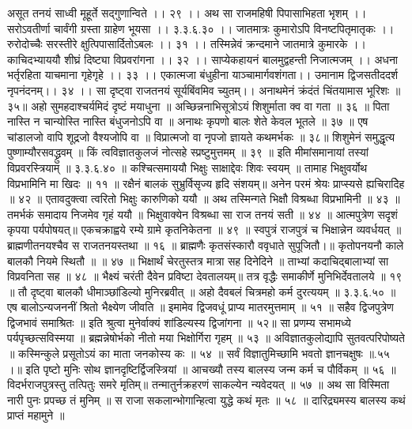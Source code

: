 असूत तनयं साध्वी मूहूर्ते सद्गुणान्विते ।। २९ ।।
अथ सा राजमहिषी पिपासाभिहता भृशम् ।।
सरोऽवतीर्णा चार्वंगी ग्रस्ता ग्राहेण भूयसा ।। ३.३.६.३० ।।
जातमात्रः कुमारोऽपि विनष्टपितृमातृकः ।।
रुरोदोच्चैः सरस्तीरे क्षुत्पिपासार्दितोऽबलः ।। ३१ ।।
तस्मिन्नेवं क्रन्दमाने जातमात्रे कुमारके ।।
काचिदभ्याययौ शीघ्रं दिष्ट्या विप्रवरांगना ।। ३२ ।।
साप्येकहायनं बालमुद्वहन्ती निजात्मजम् ।।
अधना भर्तृरहिता याचमाना गृहेगृहे ।। ३३ ।।
एकात्मजा बंधुहीना याञ्चामार्गवशंगता।।
उमानाम द्विजसतीददर्श नृपनंदनम्।। ३४ ।।
सा दृष्ट्वा राजतनयं सूर्यबिंवमिव च्युतम्।।
अनाथमेनं क्रंदंतं चिंतयामास भूरिशः ॥ ३५॥
अहो सुमहदाश्चर्यमिदं दृष्टं मयाधुना ॥
अच्छिन्ननाभिसूत्रोऽयं शिशुर्माता क्व वा गता ॥ ३६ ॥
पिता नास्ति न चान्योस्ति नास्ति बंधुजनोऽपि वा ॥
अनाथः कृपणो बालः शेते केवल भूतले ॥ ३७ ॥
एष चांडालजो वापि शूद्रजो वैश्यजोपि वा ॥
विप्रात्मजो वा नृपजो ज्ञायते कथमर्भकः ॥ ३८॥
शिशुमेनं समुद्धृत्य पुष्णाम्यौरसवद्ध्रुवम् ॥
किं त्वविज्ञातकुलजं नोत्सहे स्प्रष्टुमुत्तमम् ॥ ३९ ॥
इति मीमांसमानायां तस्यां विप्रवरस्त्रियाम् ॥ ३.३.६.४० ॥
कश्चित्समाययौ भिक्षुः साक्षाद्देवः शिवः स्वयम् ॥
तामाह भिक्षुवर्योथ विप्रभामिनि मा खिदः ॥ ११ ॥
रक्षैनं बालकं सुभ्रुर्विसृज्य हृदि संशयम्॥
अनेन परमं श्रेयः प्राप्स्यसे ह्यचिरादेिह ॥ ४२ ॥
एतावदुक्त्वा त्वरितो भिक्षुः कारुणिको ययौ ॥
अथ तस्मिन्गते भिक्षौ विश्रब्धा विप्रभामिनी ॥ ४३ ॥
तमर्भकं समादाय निजमेव गृहं ययौ ॥
भिक्षुवाक्येन विश्रब्धा सा राज तनयं सती ॥ ४४ ॥
आत्मपुत्रेण सदृशं कृपया पर्यपोषयत्॥
एकचक्राह्वये रम्ये ग्रामे कृतनिकेतना ॥ ४९ ॥
स्वपुत्रं राजपुत्रं च भिक्षान्नेन व्यवर्धयत् ॥
ब्राह्मणीतनयश्चैव स राजतनयस्तथा ॥ १६ ॥
ब्राह्मणैः कृतसंस्कारौ ववृधाते सुपूजितौ।॥
कृतोपनयनौ काले बालकौ नियमे स्थितौ ॥ ॥ ४७ ॥
भिक्षार्थं चेरतुस्तत्र मात्रा सह दिनेदिने ॥
ताभ्यां कदाचिद्बालाभ्यां सा विप्रवनिता सह ॥ ४८ ॥
भैक्ष्यं चरंती दैवेन प्रविष्टा देवतालयम्॥
तत्र वृद्धैः समाकीर्णे मुनिभिर्देवतालये ॥ १९ ॥
तौ दृष्ट्वा बालकौ धीमाञ्छांडिल्यो मुनिरब्रवीत् ॥
अहो दैवबलं चित्रमहो कर्म दुरत्ययम् ॥ ३.३.६.५० ॥
एष बालोऽन्यजननीं श्रितो भैक्ष्येण जीवति ॥
इमामेव द्विजवधूं प्राप्य मातरमुत्तमाम् ॥ ५१ ॥
सहैव द्विजपुत्रेण द्विजभावं समाश्रितः ॥
इति श्रुत्वा मुनेर्वाक्यं शांडिल्यस्य द्विजांगना ॥ ५२॥
सा प्रणम्य सभामध्ये पर्यपृच्छत्सविस्मया ॥
ब्रह्मन्नेषोर्भको नीतो मया भिक्षोर्गिरा गृहम् ॥ ५३ ॥
अविज्ञातकुलोद्यापि सुतवत्परिपोष्यते ॥
कस्मिन्कुले प्रसूतोऽयं का माता जनकोस्य कः ॥ ५४ ॥
सर्वं विज्ञातुमिच्छामि भवतो ज्ञानचक्षुषः ॥.५५ ।॥
इति पृष्टो मुनिः सोथ ज्ञानदृष्टिर्द्विजस्त्रियां ॥
आचख्यौ तस्य बालस्य जन्म कर्म च पौर्विकम् ॥ ५६ ॥
विदर्भराजपुत्रस्तु तत्पितुः समरे मृतिम्॥
तन्मातुर्नक्रहरणं साकल्येन न्यवेदयत् ॥ ५७ ॥
अथ सा विस्मिता नारी पुनः प्रपच्छ तं मुनिम् ॥
स राजा सकलान्भोगान्हित्वा युद्धे कथं मृतः ॥ ५८ ॥
दारिद्र्यमस्य बालस्य कथं प्राप्तं महामुने ॥
